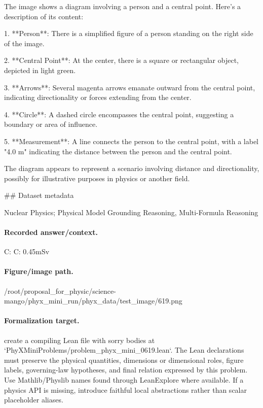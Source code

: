The image shows a diagram involving a person and a central point. Here's a description of its content:

1. **Person**: There is a simplified figure of a person standing on the right side of the image.

2. **Central Point**: At the center, there is a square or rectangular object, depicted in light green.

3. **Arrows**: Several magenta arrows emanate outward from the central point, indicating directionality or forces extending from the center.

4. **Circle**: A dashed circle encompasses the central point, suggesting a boundary or area of influence.

5. **Measurement**: A line connects the person to the central point, with a label "4.0 m" indicating the distance between the person and the central point.

The diagram appears to represent a scenario involving distance and directionality, possibly for illustrative purposes in physics or another field.

\#\# Dataset metadata

Nuclear Physics; Physical Model Grounding Reasoning, Multi-Formula Reasoning

\paragraph{Recorded answer/context.}
C: C: 0.45mSv

\paragraph{Figure/image path.}
/root/proposal\_for\_physic/science-mango/phyx\_mini\_run/phyx\_data/test\_image/619.png

\paragraph{Formalization target.}
create a compiling Lean file with sorry bodies at `PhyXMiniProblems/problem\_phyx\_mini\_0619.lean`. The Lean declarations must preserve the physical quantities, dimensions or dimensional roles, figure labels, governing-law hypotheses, and final relation expressed by this problem.
Use Mathlib/Physlib names found through LeanExplore where available. If a physics API is missing, introduce faithful local abstractions rather than scalar placeholder aliases.

